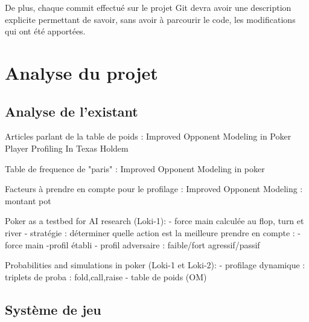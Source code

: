 \documentclass{report}
\begin{document}
De plus, chaque commit effectué sur le projet Git devra avoir une description explicite permettant de savoir, sans avoir à parcourir le code, les modifications qui ont été apportées.\par

\chapter{Analyse du projet}

\section{Analyse de l'existant}


Articles parlant de la table de poids :
Improved Opponent Modeling in Poker
Player Profiling In Texas Holdem

Table de frequence de "paris" : 
Improved Opponent Modeling in poker

Facteurs à prendre en compte pour le profilage :
Improved Opponent Modeling : montant pot


Poker as a testbed for AI research (Loki-1):
- force main calculée au flop, turn et river
- stratégie : déterminer quelle action est la meilleure
			prendre en compte : -force main
								-profil établi
- profil adversaire : faible/fort agressif/passif



Probabilities and simulations in poker (Loki-1 et Loki-2):
- profilage dynamique : triplets de proba : fold,call,raise
- table de poids (OM)

\section{Système de jeu}
\end{document}
